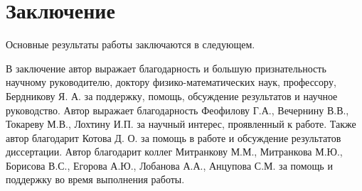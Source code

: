 \chapter*{Заключение}                       %


Основные результаты работы заключаются в следующем.



В заключение автор выражает благодарность и большую признательность научному руководителю, доктору физико-математических наук, профессору, Бердникову Я. А. за поддержку, помощь, обсуждение результатов и научное руководство. Автор выражает благодарность Феофилову Г.А., Вечернину В.В., Токареву М.В., Лохтину И.П. за научный интерес, проявленный к работе. Так­же автор благодарит Котова Д. О. за помощь в работе и обсуждение результатов диссертации. Автор благодарит коллег Митранкову М.М., Митранкова М.Ю., Борисова В.С., Егорова А.Ю., Лобанова А.А., Анцупова С.М. за помощь и поддержку во время выполнения работы.

